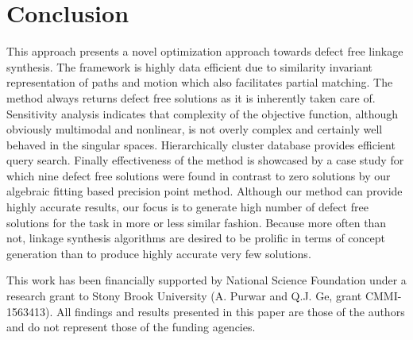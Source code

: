 \documentclass[twocolumn,10pt]{asme2e}
\begin{document}
\section*{Conclusion}
This approach presents a novel optimization approach towards defect free linkage synthesis.
The framework is highly data efficient due to similarity invariant representation of paths and motion which also facilitates partial matching.
The method always returns defect free solutions as it is inherently taken care of.
Sensitivity analysis indicates that complexity of the objective function, although obviously multimodal and nonlinear, is not overly complex and certainly well behaved in the singular spaces.
Hierarchically cluster database provides efficient query search.
Finally effectiveness of the method is showcased by a case study for which nine defect free solutions were found in contrast to zero solutions by our algebraic fitting based precision point method.
Although our method can provide highly accurate results, our focus is to generate high number of defect free solutions for the task in more or less similar fashion.
Because more often than not, linkage synthesis algorithms are desired to be prolific in terms of concept generation than to produce highly accurate very few solutions.

\begin{acknowledgment}
This work has been financially supported by National Science Foundation under a research grant to Stony Brook University (A. Purwar and Q.J. Ge, grant CMMI-1563413). All findings and results presented in this paper are those of the authors and do not represent those of the funding agencies.
\end{acknowledgment}



\newpage
\clearpage
\listoftables
\listoffigures
\end{document}

